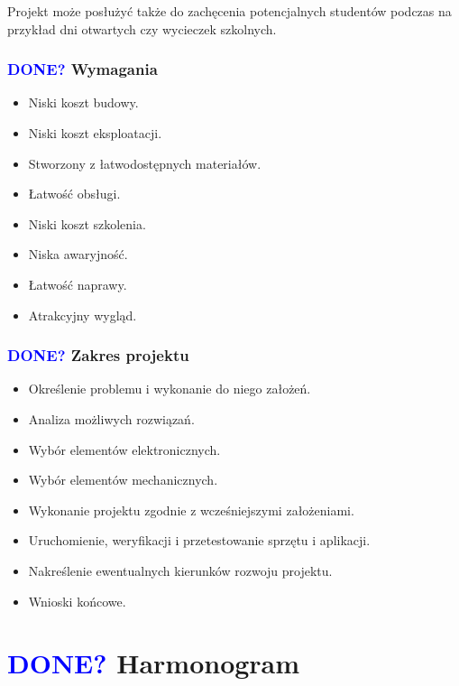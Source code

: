 \documentclass[11pt,titlepage,a4paper]{article}
\begin{document}
Projekt może posłużyć także do zachęcenia potencjalnych studentów podczas na przykład dni otwartych czy wycieczek szkolnych.

\newpage

\subsubsection{\textcolor{blue}{DONE?} Wymagania}

\begin{itemize}
    \item Niski koszt budowy.
    \item Niski koszt eksploatacji.
    \item Stworzony z łatwodostępnych materiałów.
    \item Łatwość obsługi.
    \item Niski koszt szkolenia.
    \item Niska awaryjność.
    \item Łatwość naprawy.
    \item Atrakcyjny wygląd.
\end{itemize}

\vspace*{2.5cm}

\subsubsection{\textcolor{blue}{DONE?} Zakres projektu}

\begin{itemize}
    \item Określenie problemu i wykonanie do niego założeń.
    \item Analiza możliwych rozwiązań.
    \item Wybór elementów elektronicznych.
    \item Wybór elementów mechanicznych.
    \item Wykonanie projektu zgodnie z wcześniejszymi założeniami.
    \item Uruchomienie, weryfikacji i przetestowanie sprzętu i aplikacji.
    \item Nakreślenie ewentualnych kierunków rozwoju projektu.
    \item Wnioski końcowe.
\end{itemize}

\newpage

\section{\textcolor{blue}{DONE?} Harmonogram}
\end{document}

